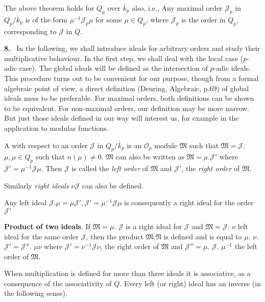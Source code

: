  The above theorem holds for $Q_p$ over $\bar{k}_p$ also, i.e., Any
 maximal order $\mathcal{J}_p$ in $Q_p/\bar{k}_p$ is of the form
 $\mu^{-1}\mathcal{J}_p \mu$ for some $\mu \in Q_p$, where
 $\mathcal{J}_p$ is the order in $Q_p$, corresponding to $\mathcal{J}$
 in $Q$. 
  
\textbf{8.}~ In the following, we shall introduce ideals for arbitrary orders
and study their multiplicative behaviour. In the first step, we shall
deal with the local case ($p$-adic case). The global ideals will be
defined as the intersection of $p$-adic ideals. This procedure turns out
to be convenient for our purpose, though from a formal algebraic point
of view, a direct definition (Deuring, Algebraic, p.69) of global
ideals mess to be preferable. For maximal orders, both definitions can
be shown to be equivalent. For non-maximal orders, our definition may
be more narrow. But just those ideals defined in our way will interest
us, for example in the application to modular functions. 
  
\begin{defi*}
  A with respect to an order $\mathcal{J}$ in $Q_p
  / \bar{k}_p$ is an $\mathscr{O}_p$ module $\mathfrak{M}$ such that
  $\mathfrak{M} = \mathcal{J}$. $\mu, \mu \in Q_p$ such that $n(\mu) \neq
  0$. $\mathfrak{M}$ can also be written as $\mathfrak{M} =
  \mu. \mathcal{J}'$ where $\mathcal{J}' = \mu^{-1} \mathcal{J}
  \mu$. Then $\mathcal{J}$ is called the {\em left order} of
  $\mathfrak{M}$ and $\mathcal{J}'$, the {\em right order} of
  $\mathfrak{M}$. 
\end{defi*}

Similarly \textit{right ideals} $\nu \mathcal{J}$ can also be defined. 

Any left ideal $\mathcal{J}. \mu = \mu \mathcal{J}',  \mathcal{J}' =
\mu^{-1} \mathcal{J} \mu$ is consequently a right ideal for the order
$\mathcal{J}'$  

\noindent
\textbf{Product of two ideals}. If  $\mathfrak{M} = \mu$.
$\mathcal{J}$ is a right ideal for $\mathcal{J}$ and $\mathfrak{M} =
\mathcal{J}$. $\nu$ left ideal for the same order $\mathcal{J}$, then
the product $\mathfrak{M}.  \mathfrak{N}$ is defined and is equal to
$\mu$. $\nu$. $\mathcal{J}' = \mathcal{J}''$. $\mu \nu$ where
$\mathcal{J}' = \nu ^{-1} \mathcal{J} \nu$, the right order of
$\mathfrak{M}$ and $\mathcal{J}'' = \mu$.  $\mathcal{J}$. $\mu^{-1}$
the left order of $\mathfrak{M}$. 

When multiplication is defined for more than three ideals it is
associative, as a consequence of the associativity of $Q$. Every left
(or right) ideal has an inverse (in the following sense). 


